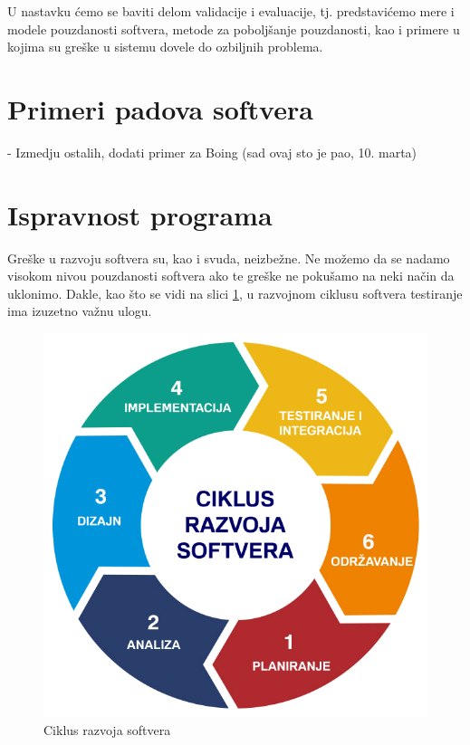 \documentclass[a4paper]{article}
\begin{document}
U nastavku ćemo se baviti delom validacije i evaluacije, tj. predstavićemo mere i modele pouzdanosti softvera, metode za poboljšanje pouzdanosti, kao i primere u kojima su greške u sistemu dovele do ozbiljnih problema.

\section{Primeri padova softvera}
\label{sec:primeri}
- Izmedju ostalih, dodati primer za Boing (sad ovaj sto je pao, 10. marta) \\


\section{Ispravnost programa}
\label{sec:ispravnost}
Greške u razvoju softvera su, kao i svuda, neizbežne.
Ne možemo da se nadamo visokom nivou pouzdanosti softvera ako te greške ne pokušamo na neki način da uklonimo.
Dakle, kao što se vidi na slici \ref{fig:rs}, u razvojnom ciklusu softvera testiranje ima izuzetno važnu ulogu.

\begin{figure}[h!]
\begin{center}
\includegraphics[scale=0.25]{rs.png}
\end{center}
\caption{Ciklus razvoja softvera}
\label{fig:rs}
\end{figure}
\end{document}
